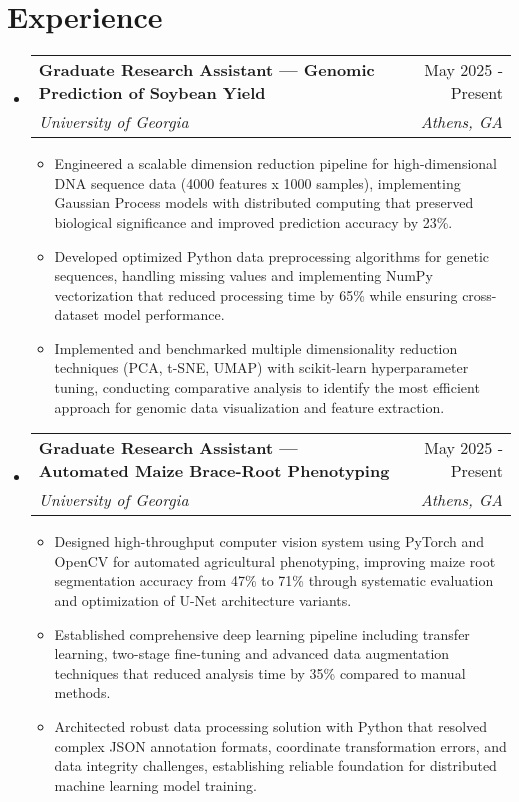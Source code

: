 \documentclass[letterpaper,10.5pt]{article}
\makeatletter
\newcommand{\resumeItem}[1]{
  \item\small{
    {#1 \vspace{-3pt}}
  }
}
\newcommand{\resumeSubheading}[4]{
  \vspace{-2pt}\item
    \begin{tabular*}{0.97\textwidth}{l@{\extracolsep{\fill}}r}
      \textbf{#1} & #2 \\
      \textit{\small#3} & \textit{\small #4} \\
    \end{tabular*}\vspace{-6pt}
}
\newcommand{\resumeSubHeadingListStart}{\begin{itemize}[leftmargin=*]}
\newcommand{\resumeSubHeadingListEnd}{\end{itemize}}
\newcommand{\resumeItemListStart}{\begin{itemize}}
\newcommand{\resumeItemListEnd}{\end{itemize}\vspace{-6pt}}
\makeatother
\begin{document}
\section{Experience}
  \resumeSubHeadingListStart
    \resumeSubheading
      {Graduate Research Assistant — Genomic Prediction of Soybean Yield}{May 2025 - Present}
      {University of Georgia}{Athens, GA}
      \resumeItemListStart
        \resumeItem{Engineered a scalable dimension reduction pipeline for high-dimensional DNA sequence data (4000 features x 1000 samples), implementing Gaussian Process models with distributed computing that preserved biological significance and improved prediction accuracy by 23\%.}
        \resumeItem{Developed optimized Python data preprocessing algorithms for genetic sequences, handling missing values and implementing NumPy vectorization that reduced processing time by 65\% while ensuring cross-dataset model performance.}
        \resumeItem{Implemented and benchmarked multiple dimensionality reduction techniques (PCA, t-SNE, UMAP) with scikit-learn hyperparameter tuning, conducting comparative analysis to identify the most efficient approach for genomic data visualization and feature extraction.}
      \resumeItemListEnd
      
    \resumeSubheading
      {Graduate Research Assistant — Automated Maize Brace-Root Phenotyping}{May 2025 - Present}
      {University of Georgia}{Athens, GA}
      \resumeItemListStart
        \resumeItem{Designed high-throughput computer vision system using PyTorch and OpenCV for automated agricultural phenotyping, improving maize root segmentation accuracy from 47\% to 71\% through systematic evaluation and optimization of U-Net architecture variants.}
        \resumeItem{Established comprehensive deep learning pipeline including transfer learning, two-stage fine-tuning and advanced data augmentation techniques that reduced analysis time by 35\% compared to manual methods.}
        \resumeItem{Architected robust data processing solution with Python that resolved complex JSON annotation formats, coordinate transformation errors, and data integrity challenges, establishing reliable foundation for distributed machine learning model training.}
      \resumeItemListEnd
  \resumeSubHeadingListEnd

\end{document}
